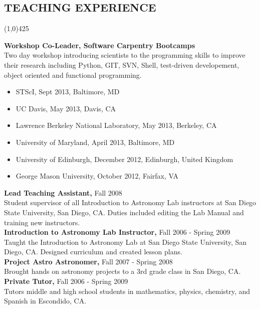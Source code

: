 \documentclass{res}
\begin{document}
\begin{resume}
\section{TEACHING EXPERIENCE}
\vspace{-.2in} 
\begin{center}
\line(1,0){425}
\end{center}
\vspace{-.24in} 
\vspace{0.1in}
   {\bf  Workshop Co-Leader, Software Carpentry Bootcamps } \\
         Two day workshop introducing scientists to the programming skills to improve their research including Python, GIT, SVN, Shell, test-driven developement, object oriented and functional programming. \\
        \begin{itemize}
        \item[] STScI, Sept 2013, Baltimore, MD
        \item[] UC Davis, May 2013, Davis, CA
        \item[] Lawrence Berkeley National Laboratory, May 2013, Berkeley, CA
        \item[] University of Maryland, April 2013, Baltimore, MD
        \item[] University of Edinburgh, December 2012, Edinburgh, United Kingdom
        \item[] George Mason University, October 2012, Fairfax, VA
        \end{itemize} 
    {\bf  Lead Teaching Assistant,} Fall 2008  \\
         Student supervisor of all Introduction to Astronomy Lab instructors at San Diego State University, 
         San Diego, CA. Duties included editing the Lab Manual and training new instructors. \\
		 
   {\bf  Introduction to Astronomy Lab Instructor,} Fall 2006 - Spring 2009  \\
         Taught the Introduction to Astronomy Lab at San Diego State University, San Diego, CA. 
         Designed curriculum and created lesson plans. \\
         
   {\bf Project Astro Astronomer, } Fall 2007 - Spring 2008 \\
   		Brought hands on astronomy projects to a 3rd grade class in San Diego, CA. \\

   {\bf Private Tutor, } Fall 2006 - Spring 2009 \\
   		Tutors middle and high school students in mathematics, physics, chemistry, and Spanish in Escondido, CA. \\
   		

\end{resume}
\end{document}
